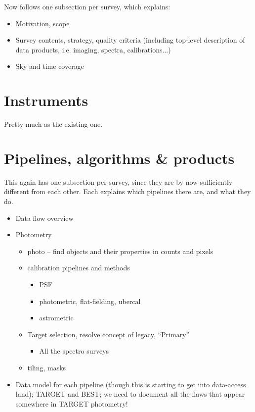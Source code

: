 \documentclass{article}
\begin{document}
Now follows one subsection per survey, which explains:
\begin{itemize}
\item Motivation, scope
\item Survey contents, strategy, quality criteria (including top-level
  description of data products, i.e. imaging, spectra,
  calibrations...)
\item Sky and time coverage
\end{itemize}

\section{Instruments}

Pretty much as the existing one.

\section{Pipelines, algorithms \& products}

This again has one subsection per survey, since they are by now
sufficiently different from each other. Each explains which pipelines
there are, and what they do.
\begin{itemize}
\item Data flow overview
\item Photometry
  \begin{itemize}
  \item photo -- find objects and their properties in counts and
    pixels
  \item calibration pipelines and methods
    \begin{itemize}
    \item PSF
    \item photometric, flat-fielding, ubercal
    \item astrometric
    \end{itemize}
  \item Target selection, resolve concept of legacy, ``Primary''
    \begin{itemize}
    \item All the spectro surveys
    \end{itemize}
  \item tiling, masks
  \end{itemize}
\item Data model for each pipeline (though this is starting to get
  into data-access land); TARGET and BEST; we need to document all the
  flaws that appear somewhere in TARGET photometry!
\end{itemize}
\end{document}
